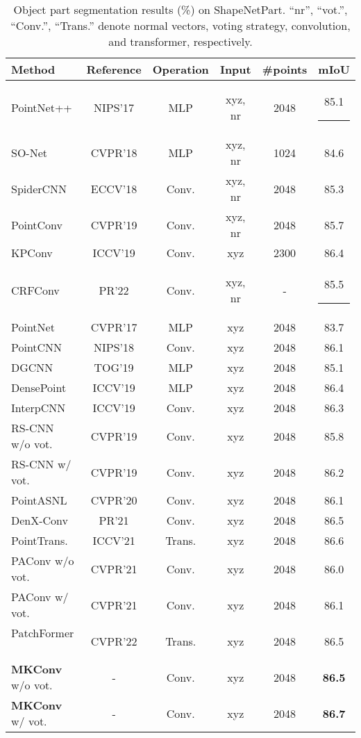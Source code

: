 \documentclass[preprint,12pt]{elsarticle}
\newcommand\Tstrut{\rule{-3pt}{2.6ex}}       \newcommand\Bstrut{\rule[-0.9ex]{-3pt}{0pt}} \newcommand{\TBstrut}{\rule{-3pt}{2.6ex} \rule[-0.9ex]{-2pt}{0pt}}  \usepackage{multirow}
\begin{document}
\begin{table}[t]
	\scriptsize
	\begin{center}
		\caption{Object part segmentation results (\%) on ShapeNetPart. ``nr'', ``vot.'', ``Conv.'', ``Trans.'' denote normal vectors, voting strategy, convolution, and transformer, respectively.}
		\footnotesize
		\begin{tabular}{l|cccc|c}
			\toprule
			Method & Reference & Operation & Input & \#points & mIoU \\
			\midrule
			\midrule
			PointNet++ \citep{qi2017pointnet++}& NIPS'17 & MLP & xyz, nr & 2048	& 85.1	\Tstrut\\
			SO-Net  \citep{li2018so} & CVPR'18 & MLP		& xyz, nr & 1024	&84.6	\\
			SpiderCNN \citep{xu2018spidercnn} & ECCV'18 &Conv.& xyz, nr & 2048&85.3	\\
			PointConv \citep{wu2019pointconv} & CVPR'19 &Conv.& xyz, nr & 2048&85.7	\\
			KPConv \citep{thomas2019kpconv} & ICCV'19 &Conv.	& xyz & 2300& 86.4	\\
			CRFConv~\cite{yang2022continuous} & PR'22 & Conv. 	& xyz, nr & - & 85.5	\Bstrut\\
			\midrule
			PointNet~\citep{qi2017pointnet}& CVPR'17 &MLP & xyz & 2048	& 83.7		\\
			PointCNN \citep{li2018pointcnn} & NIPS'18 & Conv.	& xyz & 2048& 86.1	\\
			DGCNN \citep{wang2019dynamic} & TOG'19	& MLP	& xyz& 2048 &85.1	\\
			DensePoint~\citep{liu2019densepoint}& ICCV'19 & MLP   &  xyz & 2048  & 86.4 \\
			InterpCNN \citep{mao2019interpolated} & ICCV'19 & Conv. & xyz& 2048	& 86.3	\\
RS-CNN \citep{liu2019relation} w/o vot. & CVPR'19 & Conv. & xyz & 2048 &85.8\\
			RS-CNN \citep{liu2019relation} w/ vot. & CVPR'19 & Conv. & xyz & 2048 &86.2\\
			PointASNL \citep{yan2020pointasnl} & CVPR'20 & Conv.  & xyz & 2048	& 86.1  \\
			DenX-Conv~\cite{lee2021connectivity} & PR'21 & Conv. & xyz& 2048	& 86.5	\\
			PointTrans.~\cite{zhao2021point} &  ICCV'21 & Trans. & xyz& 2048	& 86.6	\\
			PAConv \citep{xu2021paconv} w/o vot. & CVPR'21  & Conv.	& xyz& 2048	& 86.0	\\
			PAConv \citep{xu2021paconv} w/ vot. & CVPR'21 & Conv. 	& xyz& 2048	& 86.1	\\
			PatchFormer ~\cite{zhang2022patchformer}  & CVPR'22 & Trans. 	& xyz& 2048	& 86.5	\\
			\textbf{MKConv} w/o vot. & - & Conv.	& xyz & 2048	& \textbf{86.5}		\\
			\textbf{MKConv} w/ vot. & - & Conv.	& xyz & 2048	& \textbf{86.7}		\\
			\hline
		\end{tabular}
		\label{tab:psg}\end{center}
\end{table}
\end{document}
